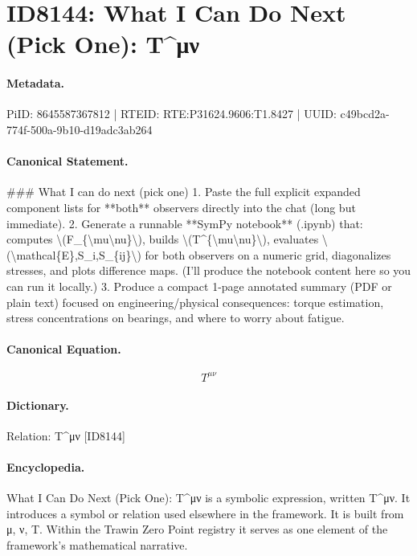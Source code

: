 \section*{ID8144: What I Can Do Next (Pick One): T\textasciicircum{}μν}
\paragraph{Metadata.}
PiID: 8645587367812 | RTEID: RTE:P31624.9606:T1.8427 | UUID: c49bcd2a-774f-500a-9b10-d19adc3ab264

\paragraph{Canonical Statement.}
\#\#\# What I can do next (pick one) 1. Paste the full explicit expanded component lists for **both** observers directly into the chat (long but immediate). 2. Generate a runnable **SymPy notebook** (.ipynb) that: computes \textbackslash{}(F\_\{\textbackslash{}mu\textbackslash{}nu\}\textbackslash{}), builds \textbackslash{}(T\textasciicircum{}\{\textbackslash{}mu\textbackslash{}nu\}\textbackslash{}), evaluates \textbackslash{}(\textbackslash{}mathcal\{E\},S\_i,S\_\{ij\}\textbackslash{}) for both observers on a numeric grid, diagonalizes stresses, and plots difference maps. (I’ll produce the notebook content here so you can run it locally.) 3. Produce a compact 1-page annotated summary (PDF or plain text) focused on engineering/physical consequences: torque estimation, stress concentrations on bearings, and where to worry about fatigue.

\paragraph{Canonical Equation.}
\[
T^{\mu\nu}
\]

\paragraph{Dictionary.}
Relation: T\textasciicircum{}μν [ID8144]

\paragraph{Encyclopedia.}
What I Can Do Next (Pick One): T\textasciicircum{}μν is a symbolic expression, written T\textasciicircum{}μν. It introduces a symbol or relation used elsewhere in the framework. It is built from μ, ν, T. Within the Trawin Zero Point registry it serves as one element of the framework's mathematical narrative.
